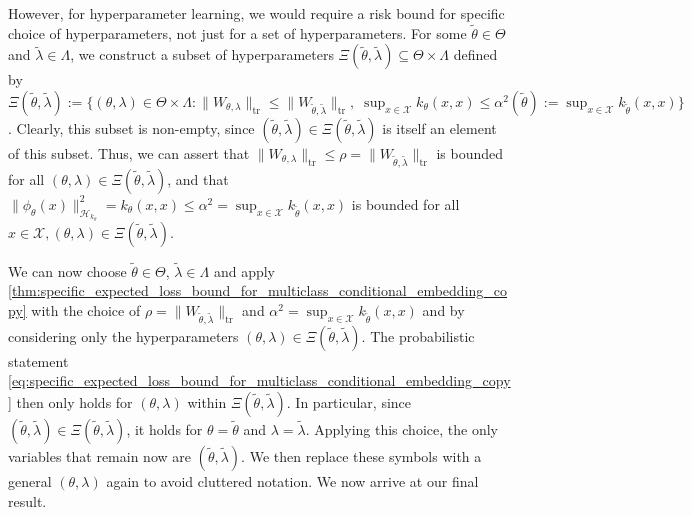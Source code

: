 \documentclass{llncs}
\begin{document}
	However, for hyperparameter learning, we would require a risk bound for specific choice of hyperparameters, not just for a set of hyperparameters. For some $\tilde{\theta} \in \Theta$ and $\tilde{\lambda} \in \Lambda$, we construct a subset of hyperparameters $\Xi(\tilde{\theta}, \tilde{\lambda}) \subseteq \Theta \times \Lambda$ defined by $\Xi(\tilde{\theta}, \tilde{\lambda}) := \{ (\theta, \lambda) \in \Theta \times \Lambda : \| W_{\theta, \lambda} \|_{\mathrm{tr}} \leq \| W_{\tilde{\theta}, \tilde{\lambda}} \|_{\mathrm{tr}}, \; \sup_{x \in \mathcal{X}} k_{\theta}(x, x) \leq \alpha^{2}(\tilde{\theta}) := \sup_{x \in \mathcal{X}} k_{\tilde{\theta}}(x, x) \}$. Clearly, this subset is non-empty, since $(\tilde{\theta}, \tilde{\lambda}) \in \Xi(\tilde{\theta}, \tilde{\lambda})$ is itself an element of this subset. Thus, we can assert that $\| W_{\theta, \lambda} \|_{\mathrm{tr}} \leq \rho = \| W_{\tilde{\theta}, \tilde{\lambda}} \|_{\mathrm{tr}}$ is bounded for all $(\theta, \lambda) \in \Xi(\tilde{\theta}, \tilde{\lambda})$, and that $\| \phi_{\theta}(x) \|_{\mathcal{H}_{k_{\theta}}}^{2} = k_{\theta}(x, x) \leq \alpha^{2} = \sup_{x \in \mathcal{X}} k_{\tilde{\theta}}(x, x)$ is bounded for all $x \in \mathcal{X}, (\theta, \lambda) \in \Xi(\tilde{\theta}, \tilde{\lambda})$.
	
	We can now choose $\tilde{\theta} \in \Theta$, $\tilde{\lambda} \in \Lambda$ and apply \cref{thm:specific_expected_loss_bound_for_multiclass_conditional_embedding_copy} with the choice of $\rho = \| W_{\tilde{\theta}, \tilde{\lambda}} \|_{\mathrm{tr}}$ and $\alpha^{2} = \sup_{x \in \mathcal{X}} k_{\tilde{\theta}}(x, x)$ and by considering only the hyperparameters $(\theta, \lambda) \in \Xi(\tilde{\theta}, \tilde{\lambda})$. The probabilistic statement \eqref{eq:specific_expected_loss_bound_for_multiclass_conditional_embedding_copy} then only holds for $(\theta, \lambda)$ within $\Xi(\tilde{\theta}, \tilde{\lambda})$. In particular, since $(\tilde{\theta}, \tilde{\lambda}) \in \Xi(\tilde{\theta}, \tilde{\lambda})$, it holds for $\theta = \tilde{\theta}$ and $\lambda = \tilde{\lambda}$. Applying this choice, the only variables that remain now are $(\tilde{\theta}, \tilde{\lambda})$. We then replace these symbols with a general $(\theta, \lambda)$ again to avoid cluttered notation. We now arrive at our final result.
	
\end{document}
